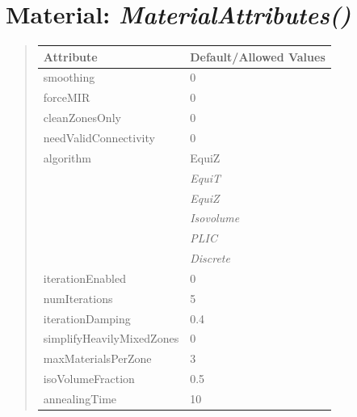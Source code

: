 \documentclass[letterpaper,10pt,english]{sphinxmanual}
\begin{document}
\section{\textbf{Material}: \emph{MaterialAttributes()}}
\label{attributes:material-materialattributes}
\begin{DUlineblock}{0em}
\item[] 
\end{DUlineblock}
\begin{quote}

\begin{tabulary}{\linewidth}{|L|L|}
\hline

\textbf{Attribute}
 & 
\textbf{Default/Allowed Values}
\\
\hline
smoothing
 & 
0
\\
\hline
forceMIR
 & 
0
\\
\hline
cleanZonesOnly
 & 
0
\\
\hline
needValidConnectivity
 & 
0
\\
\hline
algorithm
 & 
EquiZ
\\
\hline & 
\emph{EquiT}
\\
\hline & 
\emph{EquiZ}
\\
\hline & 
\emph{Isovolume}
\\
\hline & 
\emph{PLIC}
\\
\hline & 
\emph{Discrete}
\\
\hline
iterationEnabled
 & 
0
\\
\hline
numIterations
 & 
5
\\
\hline
iterationDamping
 & 
0.4
\\
\hline
simplifyHeavilyMixedZones
 & 
0
\\
\hline
maxMaterialsPerZone
 & 
3
\\
\hline
isoVolumeFraction
 & 
0.5
\\
\hline
annealingTime
 & 
10
\\
\hline\end{tabulary}

\end{quote}

\begin{DUlineblock}{0em}
\item[] 
\end{DUlineblock}

\begin{DUlineblock}{0em}
\item[] 
\end{DUlineblock}
\end{document}
